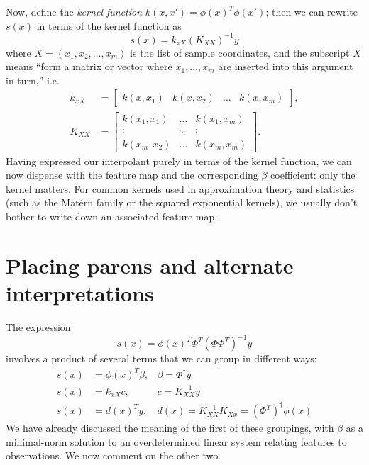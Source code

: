 \documentclass[12pt, leqno]{article} %
\begin{document}
Now, define the {\em kernel function} $k(x, x') = \phi(x)^T \phi(x')$;
then we can rewrite $s(x)$ in terms of the kernel function as
\[
  s(x) = k_{xX} (K_{XX})^{-1} y
\]
where $X = (x_1, x_2, \ldots, x_m)$ is the list of sample coordinates,
and the subscript $X$ means ``form a matrix or vector where $x_1,
\ldots, x_m$ are inserted into this argument in turn,'' i.e.
\begin{align*}
  k_{xX} &= \begin{bmatrix} k(x, x_1) & k(x, x_2) & \ldots & k(x, x_m)
           \end{bmatrix}, \\
  K_{XX} &=
  \begin{bmatrix}
    k(x_1, x_1) & \ldots & k(x_1, x_m) \\
    \vdots & \ddots & \vdots \\
    k(x_m, x_2) & \ldots & k(x_m, x_m)
  \end{bmatrix}.
\end{align*}
Having expressed our interpolant purely in terms of the kernel
function, we can now dispense with the feature map and the
corresponding $\beta$ coefficient: only the kernel matters.
For common kernels used in approximation theory and statistics
(such as the Mat\'ern family or the squared exponential kernels),
we usually don't bother to write down an associated feature map.

\section{Placing parens and alternate interpretations}


The expression
\[
  s(x) = \phi(x)^T \Phi^T (\Phi \Phi^T)^{-1} y
\]
involves a product of several terms that we can group in different
ways:
\begin{align*}
  s(x) &= \phi(x)^T \beta, & \beta = \Phi^\dagger y \\
  s(x) &= k_{xX} c, & c = K_{XX}^{-1} y \\
  s(x) &= d(x)^T y, & d(x) = K_{XX}^{-1} K_{Xx} = (\Phi^T)^\dagger \phi(x)
\end{align*}
We have already discussed the meaning of the first of these groupings,
with $\beta$ as a minimal-norm solution to an overdetermined linear
system relating features to observations.  We now comment on the other
two.
\end{document}
